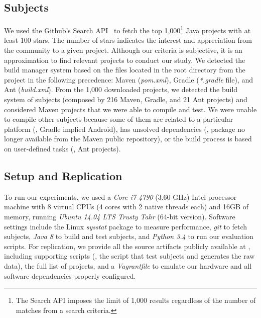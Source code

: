 \subsection{Subjects}
\label{sec:subjects}

We used the Github's
Search API~\cite{githubsearch} to fetch the top 1,000\footnote{The
Search API imposes the limit of 1,000 results regardless of the number
of matches from a search criteria.} Java projects with at least 100
stars. The number of stars indicates the interest and appreciation
from the community to a given project.
 Although our
criteria is subjective, it is an approximation to find relevant
projects to conduct our study. We detected the build manager system
based on the files located in the root directory from the project in
the following precedence: Maven (\emph{pom.xml}), Gradle
(\emph{*.gradle} file), and Ant (\emph{build.xml}). From the 1,000 downloaded projects, we detected the build
system of  subjects (composed by 216 Maven,  Gradle,
and 21 Ant projects) and considered  Maven projects that we
were able to compile and test. We were unable to compile other
subjects because some of them are related to a particular platform
(\eg, Gradle implied Android), has unsolved dependencies (\eg, package
no longer available from the Maven public repository), or the build
process is based on user-defined tasks (\eg, Ant projects).

\subsection{Setup and Replication}
\label{sec:setup}

To run our experiments, we used a \emph{Core i7-4790} (3.60 GHz) Intel
processor machine with 8 virtual CPUs (4 cores with 2 native threads
each) and 16GB of memory, running \emph{Ubuntu 14.04 LTS Trusty Tahr}
(64-bit version). Software settings include the Linux \emph{sysstat}
package to measure performance, \emph{git} to fetch subjects,
\emph{Java 8} to build and test subjects, and \emph{Python 3.4} to run
our evaluation scripts. For replication, we provide all the source
artifacts publicly available at , including
supporting scripts (\eg, the script that test subjects and generates
the raw data), the full list of projects, and a \emph{Vagrantfile} to
emulate our hardware and all software dependencies properly configured.

